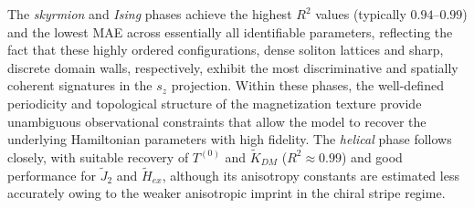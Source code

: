 \documentclass[final,5p,times,twocolumn]{elsarticle}
\begin{document}
The \textit{skyrmion} and
\textit{Ising} phases achieve the highest $R^2$ values (typically
$0.94$--$0.99$) and the lowest MAE across essentially all
identifiable parameters, reflecting the fact that these highly
ordered configurations, dense soliton lattices and sharp,
discrete domain walls, respectively, exhibit the most
discriminative and spatially coherent signatures in the $s_z$
projection. Within these phases, the well-defined periodicity and
topological structure of the magnetization texture provide
unambiguous observational constraints that allow the model to
recover the underlying Hamiltonian parameters with high fidelity.
The \textit{helical} phase follows closely, with suitable recovery
of $T^{(0)}$ and $\tilde{K}_{DM}$ ($R^2 \approx 0.99$) and good
performance for $\tilde{J}_2$ and $\tilde{H}_{ex}$, although its
anisotropy constants are estimated less accurately owing to the
weaker anisotropic imprint in the chiral stripe regime.
\end{document}
